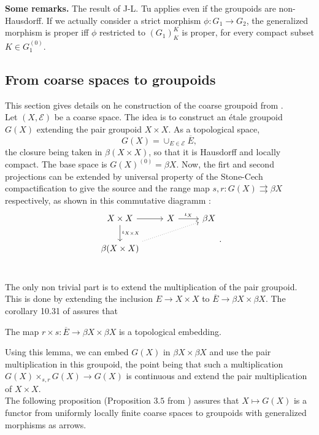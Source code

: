 \textbf{Some remarks.} The result of J-L. Tu applies even if the groupoids are non-Hausdorff. If we actually consider a strict morphism $\phi: G_1 \rightarrow G_2$, the generalized morphism is proper iff $\phi$ restricted to $(G_1)^K_K$ is proper, for every compact subset $K\in G_1^{(0)}$.\\ 

\subsection{From coarse spaces to groupoids}

This section gives details on he construction of the coarse groupoid from \cite{SkTuYu}.\\

Let $(X,\mathcal E)$ be a coarse space. The idea is to construct an étale groupoid $G(X)$ extending the pair groupoid $X\times X$. As a topological space, 
\[G(X)= \cup_{E\in \mathcal E} \overline{E},\]
the closure being taken in $\beta (X\times X)$, so that it is Hausdorff and locally compact. The base space is $G(X)^{(0)}=\beta X$. Now, the firt and second projections can be extended by universal property of the Stone-Cech compactification to give the source and the range map $s,r : G(X)\rightrightarrows \beta X$ respectively, as shown in this commutative diagramm :  
\[\begin{tikzcd}
X\times X \arrow{r}\arrow{d}{\iota_{X\times X}} &  X \arrow{r}{\iota_X} & \beta X \\
\beta (X\times X) \arrow[dotted]{urr} & & \\ 
\end{tikzcd}.\]

The only non trivial part is to extend the multiplication of the pair groupoid. This is done by extending the inclusion $E \rightarrow X\times X$ to $\overline{E} \rightarrow \beta X\times \beta X$. The corollary 10.31 of \cite{RoeCoarse} assures that 
\begin{lem}
The map $r\times s : \overline E \rightarrow \beta X\times \beta X$ is a topological embedding.
\end{lem}
Using this lemma, we can embed $G(X)$ in $\beta X\times \beta X$ and use the pair multiplication in this groupoid, the point being that such a multiplication $G(X)\times_{s,r} G(X) \rightarrow G(X)$ is continuous and extend the pair multiplication of $X\times X$.\\

The following proposition (Proposition $3.5$ from \cite{SkTuYu}) assures that $X\mapsto G(X)$ is a functor from uniformly locally finite coarse spaces to groupoids with generalized morphisms as arrows.\\

